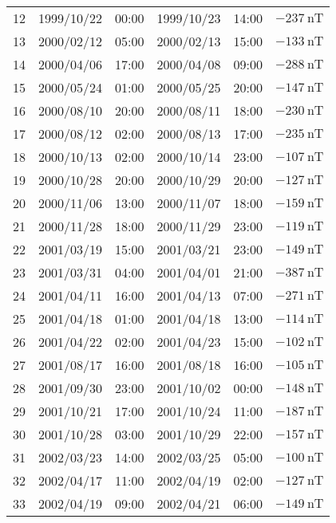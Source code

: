 \begin{table}[h]
\begin{adjustbox}{width=\textwidth,totalheight=0.9\textheight,keepaspectratio}
\begin{tabular}{cccccc}
    12 & 1999/10/22 & 00:00 & 1999/10/23 & 14:00 & $ \SI{-237}{\nano\tesla}$ \\
    13 & 2000/02/12 & 05:00 & 2000/02/13 & 15:00 & $ \SI{-133}{\nano\tesla}$ \\
    14 & 2000/04/06 & 17:00 & 2000/04/08 & 09:00 & $ \SI{-288}{\nano\tesla}$ \\
    15 & 2000/05/24 & 01:00 & 2000/05/25 & 20:00 & $ \SI{-147}{\nano\tesla}$ \\
    16 & 2000/08/10 & 20:00 & 2000/08/11 & 18:00 & $ \SI{-230}{\nano\tesla}$ \\
    17 & 2000/08/12 & 02:00 & 2000/08/13 & 17:00 & $ \SI{-235}{\nano\tesla}$ \\
    18 & 2000/10/13 & 02:00 & 2000/10/14 & 23:00 & $ \SI{-107}{\nano\tesla}$ \\
    19 & 2000/10/28 & 20:00 & 2000/10/29 & 20:00 & $ \SI{-127}{\nano\tesla}$ \\
    20 & 2000/11/06 & 13:00 & 2000/11/07 & 18:00 & $ \SI{-159}{\nano\tesla}$ \\
    21 & 2000/11/28 & 18:00 & 2000/11/29 & 23:00 & $ \SI{-119}{\nano\tesla}$ \\
    22 & 2001/03/19 & 15:00 & 2001/03/21 & 23:00 & $ \SI{-149}{\nano\tesla}$ \\
    23 & 2001/03/31 & 04:00 & 2001/04/01 & 21:00 & $ \SI{-387}{\nano\tesla}$ \\
    24 & 2001/04/11 & 16:00 & 2001/04/13 & 07:00 & $ \SI{-271}{\nano\tesla}$ \\
    25 & 2001/04/18 & 01:00 & 2001/04/18 & 13:00 & $ \SI{-114}{\nano\tesla}$ \\
    26 & 2001/04/22 & 02:00 & 2001/04/23 & 15:00 & $ \SI{-102}{\nano\tesla}$ \\
    27 & 2001/08/17 & 16:00 & 2001/08/18 & 16:00 & $ \SI{-105}{\nano\tesla}$ \\
    28 & 2001/09/30 & 23:00 & 2001/10/02 & 00:00 & $ \SI{-148}{\nano\tesla}$ \\
    29 & 2001/10/21 & 17:00 & 2001/10/24 & 11:00 & $ \SI{-187}{\nano\tesla}$ \\
    30 & 2001/10/28 & 03:00 & 2001/10/29 & 22:00 & $ \SI{-157}{\nano\tesla}$ \\
    31 & 2002/03/23 & 14:00 & 2002/03/25 & 05:00 & $ \SI{-100}{\nano\tesla}$ \\
    32 & 2002/04/17 & 11:00 & 2002/04/19 & 02:00 & $ \SI{-127}{\nano\tesla}$ \\
    33 & 2002/04/19 & 09:00 & 2002/04/21 & 06:00 & $ \SI{-149}{\nano\tesla}$ \\

\end{tabular}
\end{adjustbox}
\end{table}

